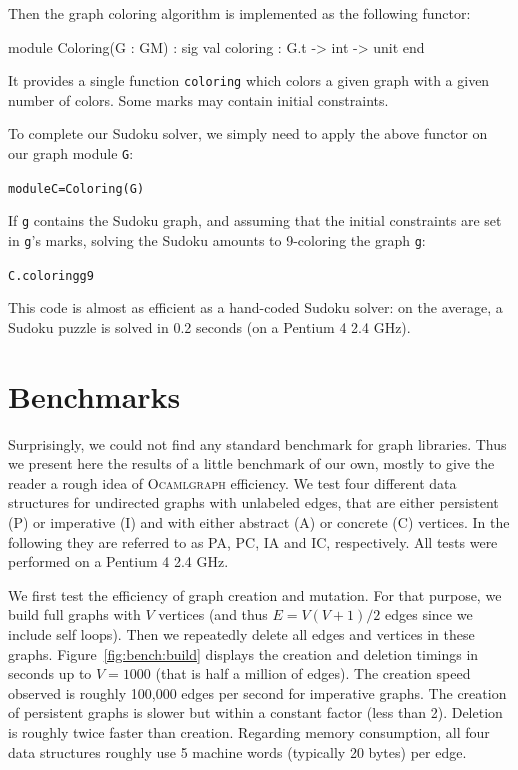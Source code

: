 \documentclass[tfpsymp]{tfp05symp}
\newcommand{\ocamlgraph}{\textsc{Ocamlgraph}\xspace}
\begin{document}
Then the graph coloring algorithm is implemented as the following functor:
\begin{ocaml}
module Coloring(G : GM) : sig
  val coloring : G.t -> int -> unit
end
\end{ocaml}
It provides a single function \texttt{coloring} which colors a given
graph with a given number of colors. Some marks may contain initial
constraints. 

To complete our Sudoku solver, we simply need to apply the above
functor on our graph module \texttt{G}:
\begin{alltt}
module C = Coloring(G)
\end{alltt}
If \texttt{g} contains the Sudoku graph, and
assuming that the initial constraints are set in \texttt{g}'s marks, 
solving the Sudoku amounts to 9-coloring the graph \texttt{g}:
\begin{alltt}
C.coloring g 9
\end{alltt}
This code is almost as efficient as a hand-coded Sudoku solver: on the
average, a Sudoku puzzle is solved in 0.2 seconds (on a Pentium 4 2.4 GHz).

\section{Benchmarks}\label{bench}

Surprisingly, we could not find any standard benchmark for graph
libraries. Thus we present here the results of a little benchmark of
our own, mostly to give the reader a rough idea of \ocamlgraph efficiency.
We test four different data structures for undirected
graphs with unlabeled edges, that are either persistent (P) or
imperative (I) and with either abstract (A) or concrete (C) vertices. In
the following they are referred to as PA, PC, IA and IC, respectively.
All tests were performed on a Pentium 4 2.4 GHz.

We first test the efficiency of graph creation and mutation. 
For that purpose, we build full graphs with $V$ vertices (and thus
$E=V(V+1)/2$ edges since we include self loops). 
Then we repeatedly delete all edges and vertices in these graphs. 
Figure~\ref{fig:bench:build} displays the creation and deletion
timings in seconds up to $V=1000$ (that is half a million of edges). 
The creation speed observed is roughly 100,000 edges per second for
imperative graphs. The creation of persistent graphs is slower but
within a constant factor (less than 2). Deletion is roughly twice
faster than creation.
Regarding memory consumption, all four data structures roughly use 5
machine words (typically 20 bytes) per edge.
\end{document}
